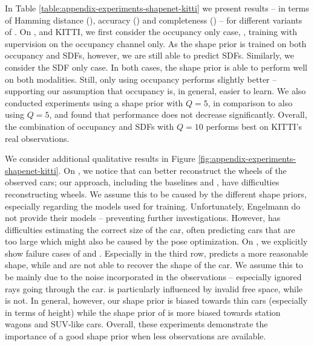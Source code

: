 \documentclass[10pt,letterpaper]{article}
\begin{document}
%
In Table \ref{table:appendix-experiments-shapenet-kitti} we present results -- in terms of Hamming distance (\Abs), accuracy (\Acc) and completeness (\Compl) -- for different variants of \AML. On \clean, \noisy and KITTI, we first consider the occupancy only case, \ie, training with supervision on the occupancy channel only. As the shape prior is trained on both occupancy and SDFs, however, we are still able to predict SDFs. Similarly, we consider the SDF only case. In both cases, the shape prior is able to perform well on both modalities. Still, only using occupancy performs slightly better -- supporting our assumption that occupancy is, in general, easier to learn.
We also conducted experiments using a shape prior with $Q = 5$, in comparison to \cite{Engelmann2016GCPR} also using $Q = 5$, and found that performance does not decrease significantly.
Overall, the combination of occupancy and SDFs with $Q = 10$ performs best on KITTI's real observations.



%
We consider additional qualitative results in Figure \ref{fig:appendix-experiments-shapenet-kitti}. On \clean, we notice that \cite{Engelmann2016GCPR} can better reconstruct the wheels of the observed cars; our approach, including the baselines \ML and \Sup, have difficulties reconstructing wheels. We assume this to be caused by the different shape priors, especially regarding the models used for training. Unfortunately, Engelmann \etal do not provide their models -- preventing further investigations. However, \cite{Engelmann2016GCPR} has difficulties estimating the correct size of the car, often predicting cars that are too large which might also be caused by the pose optimization. On \noisy, we explicitly show failure cases of \ML and \AML. Especially in the third row, \cite{Engelmann2016GCPR} predicts a more reasonable shape, while \ML and \AML are not able to recover the shape of the car. We assume this to be mainly due to the noise incorporated in the observations -- especially ignored rays going through the car. \AML is particularly influenced by invalid free space, while \cite{Engelmann2016GCPR} is not. In general, however, our shape prior is biased towards thin cars (especially in terms of height) while the shape prior of \cite{Engelmann2016GCPR} is more biased towards station wagons and SUV-like cars. Overall, these experiments demonstrate the importance of a good shape prior when less observations are available.
\end{document}
